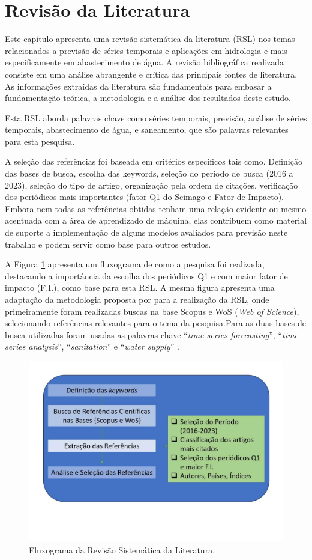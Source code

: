 \section{Revis\~ao da Literatura}\label{sec:refteo}

Este capítulo apresenta uma revisão sistemática  da literatura (RSL) nos temas relacionados a previsão de séries temporais e aplicações em hidrologia e mais especificamente em abastecimento de água. A revisão bibliográfica realizada consiste em uma análise abrangente e crítica das principais fontes de literatura. As informações extraídas da literatura são fundamentais para embasar a fundamentação teórica, a metodologia e a análise dos resultados deste estudo.

Esta RSL aborda palavras chave como séries temporais, previsão, análise de séries temporais, abastecimento de água, e saneamento, que são palavras relevantes para esta pesquisa. 

A seleção das referências foi baseada em critérios específicos tais como. Definição das bases de busca, escolha das keywords, seleção do período de busca (2016 a 2023), seleção do tipo de artigo, organização pela ordem de citações, verificação dos periódicos mais importantes (fator Q1 do Scimago e Fator de Impacto). Embora nem todas as referências obtidas tenham uma relação evidente ou mesmo acentuada com a área de aprendizado de máquina, elas contribuem como material de suporte a implementação de alguns modelos avaliados para previsão neste trabalho e podem servir como base para outros estudos.

A Figura \ref{fig:serie-temporal} apresenta um fluxograma de como a pesquisa foi realizada, destacando a importância da escolha dos periódicos Q1 e com maior fator de impacto (F.I.), como base para esta RSL. A mesma figura apresenta uma adaptação da metodologia proposta por  para a realização da RSL, onde primeiramente foram realizadas buscas na base Scopus e WoS (\textit{Web of Science}), selecionando referências relevantes para o tema da pesquisa.Para as duas bases de busca utilizadas foram usadas as palavras-chave ``\textit{time series forecasting}'', ``\textit{time series analysis}'', ``\textit{sanitation}'' e ``\textit{water supply}'' .

\begin{figure}[!htb]
	\centering
	\caption{Fluxograma da Revisão Sistemática da Literatura.}
	\label{fig:serie-temporal}
	\includegraphics[width=0.7\linewidth]{Revisao/Figuras/Figura2.pdf}
\end{figure}

